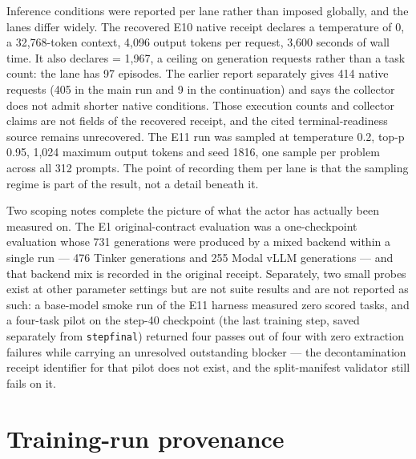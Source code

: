 \documentclass[12pt,a4paper]{report}
\DeclareRobustCommand{\longtok}[1]{\texttt{\seqsplit{#1}}}
\begin{document}
Inference conditions were reported per lane rather than imposed
globally, and the lanes differ widely. The recovered E10 native receipt
declares a temperature of 0, a 32,768-token context, 4,096 output tokens
per request, 3,600 seconds of wall time. It also declares
\longtok{max\_\allowbreak{}generation\_\allowbreak{}requests} = 1,967, a ceiling on generation
requests rather than a task count: the lane has 97 episodes. The earlier
report separately gives 414 native requests (405 in the main run and 9
in the continuation) and says the collector does not admit shorter
native conditions. Those execution counts and collector claims are not
fields of the recovered receipt, and the cited terminal-readiness source
remains unrecovered. The E11 run was sampled at temperature 0.2, top-p
0.95, 1,024 maximum output tokens and seed 1816, one sample per problem
across all 312 prompts. The point of recording them per lane is that the
sampling regime is part of the result, not a detail beneath it.

Two scoping notes complete the picture of what the actor has actually
been measured on. The E1 original-contract evaluation was a
one-checkpoint evaluation whose 731 generations were produced by a mixed
backend within a single run --- 476 Tinker generations and 255 Modal
vLLM generations --- and that backend mix is recorded in the original
receipt. Separately, two small probes exist at other parameter settings
but are not suite results and are not reported as such: a base-model
smoke run of the E11 harness measured zero scored tasks, and a four-task
pilot on the step-40 checkpoint (the last training step, saved
separately from \texttt{stepfinal}) returned four passes out of four
with zero extraction failures while carrying an unresolved outstanding
blocker --- the decontamination receipt identifier for that pilot does
not exist, and the split-manifest validator still fails on it.

\section{Training-run provenance}\label{training-run-provenance}
\end{document}
